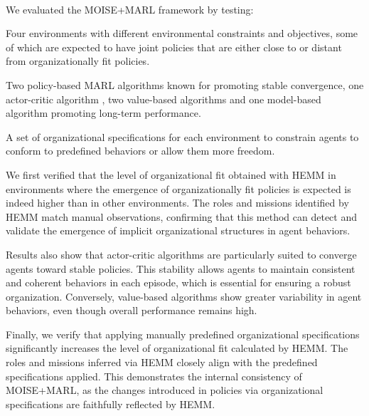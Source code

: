 \documentclass[sigconf,anonymous]{aamas}
\begin{document}
\


\noindent We evaluated the MOISE+MARL framework by testing:
\begin{enumerate*}[label={\roman*) },itemjoin={; \quad}]
  \item Four environments with different environmental constraints and objectives, some of which are expected to have joint policies that are either close to or distant from organizationally fit policies. %
  \item Two policy-based MARL algorithms
  known for promoting stable convergence, one actor-critic algorithm
  , two value-based algorithms
  and one model-based algorithm
  promoting long-term performance.
  \item A set of organizational specifications for each environment to constrain agents to conform to predefined behaviors or allow them more freedom.
\end{enumerate*}


We first verified that the level of organizational fit obtained with HEMM in environments where the emergence of organizationally fit policies is expected is indeed higher than in other environments. The roles and missions identified by HEMM match manual observations, confirming that this method can detect and validate the emergence of implicit organizational structures in agent behaviors.

Results also show that actor-critic algorithms
are particularly suited to converge agents toward stable policies. This stability allows agents to maintain consistent and coherent behaviors in each episode, which is essential for ensuring a robust organization. Conversely, value-based algorithms
show greater variability in agent behaviors, even though overall performance remains high.

Finally, we verify that applying manually predefined organizational specifications significantly increases the level of organizational fit calculated by HEMM. The roles and missions inferred via HEMM closely align with the predefined specifications applied. This demonstrates the internal consistency of MOISE+MARL, as the changes introduced in policies via organizational specifications are faithfully reflected by HEMM.
\end{document}
